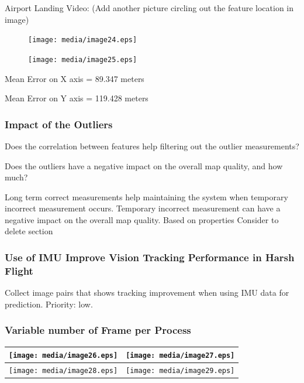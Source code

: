 Airport Landing Video: (Add another picture circling out the feature 
location in image)

\begin{figure}[h]
\centering
\texttt{[image: media/image24.eps]}
\end{figure}


\begin{figure}[h]
\centering
\texttt{[image: media/image25.eps]}
\end{figure}


Mean Error on X axis = 89.347 meters

Mean Error on Y axis = 119.428 meters

\subsubsection{Impact of the Outliers}
Does the correlation between features help filtering out the outlier 
measurements?

Does the outliers have a negative impact on the overall map quality, and 
how much?

Long term correct measurements help maintaining the system when 
temporary incorrect measurement occurs. Temporary incorrect measurement 
can have a negative impact on the overall map quality. Based on 
properties Consider to delete section

\subsubsection{Use of IMU Improve Vision Tracking Performance in Harsh 
Flight}\label{section:_Toc332876148}
Collect image pairs that shows tracking improvement when using IMU data 
for prediction. Priority: low.

\subsubsection{Variable number of Frame per Process}
\begin{table}[h]
\centering
\begin{tabular}{|l|l|}
\hline
\texttt{[image: media/image26.eps]}
 & \texttt{[image: media/image27.eps]}
 \\
\hline
\texttt{[image: media/image28.eps]}
 & \texttt{[image: media/image29.eps]}
 \\
\hline
\end{tabular}
\end{table}









